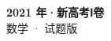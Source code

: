 \documentclass[zihao=-4, a4paper]{ctexart}
\begin{document}
\begin{center}
  {\Large\bfseries 2021 年·新高考Ⅰ卷}\\[4pt]
  {\large 数学 · 试题版}
\end{center}
\medskip
{}

\end{document}
